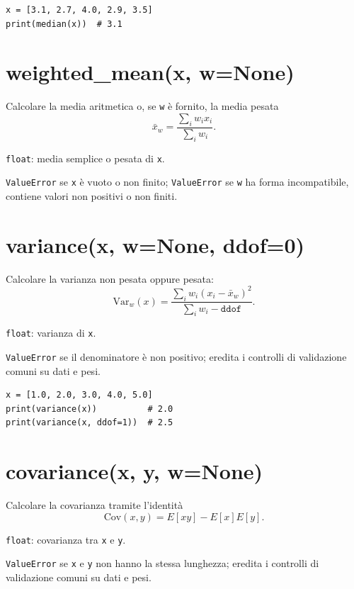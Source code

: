 \begin{verbatim}
x = [3.1, 2.7, 4.0, 2.9, 3.5]
print(median(x))  # 3.1
\end{verbatim}

\section{\texorpdfstring{weighted\_mean(x, w=None)}{weighted\_mean(x, w=None)}}
\label{sec:weighted-mean}
\begin{apidesc}
  \item[\textbf{Scopo}]
    Calcolare la media aritmetica o, se \texttt{w} è fornito, la media pesata
    \[
      \bar{x}_w = \frac{\sum_i w_i x_i}{\sum_i w_i}.
    \]
  \item[\textbf{Restituisce}]
    \texttt{float}: media semplice o pesata di \texttt{x}.
  \item[\textbf{Eccezioni}]
    \texttt{ValueError} se \texttt{x} è vuoto o non finito;
    \texttt{ValueError} se \texttt{w} ha forma incompatibile, contiene valori non positivi o non finiti.
\end{apidesc}

\section{\texorpdfstring{variance(x, w=None, ddof=0)}{variance(x, w=None, ddof=0)}}
\label{sec:variance}
\begin{apidesc}
  \item[\textbf{Scopo}]
    Calcolare la varianza non pesata oppure pesata:
    \[
      \mathrm{Var}_w(x) = \frac{\sum_i w_i (x_i - \bar{x}_w)^2}{\sum_i w_i - \texttt{ddof}}.
    \]
  \item[\textbf{Restituisce}]
    \texttt{float}: varianza di \texttt{x}.
  \item[\textbf{Eccezioni}]
    \texttt{ValueError} se il denominatore è non positivo;
    eredita i controlli di validazione comuni su dati e pesi.
\end{apidesc}

\begin{verbatim}
x = [1.0, 2.0, 3.0, 4.0, 5.0]
print(variance(x))          # 2.0
print(variance(x, ddof=1))  # 2.5
\end{verbatim}

\section{\texorpdfstring{covariance(x, y, w=None)}{covariance(x, y, w=None)}}
\label{sec:covariance}
\begin{apidesc}
  \item[\textbf{Scopo}]
    Calcolare la covarianza tramite l'identità
    \[
      \mathrm{Cov}(x,y) = E[xy] - E[x]E[y].
    \]
  \item[\textbf{Restituisce}]
    \texttt{float}: covarianza tra \texttt{x} e \texttt{y}.
  \item[\textbf{Eccezioni}]
    \texttt{ValueError} se \texttt{x} e \texttt{y} non hanno la stessa lunghezza;
    eredita i controlli di validazione comuni su dati e pesi.
\end{apidesc}


